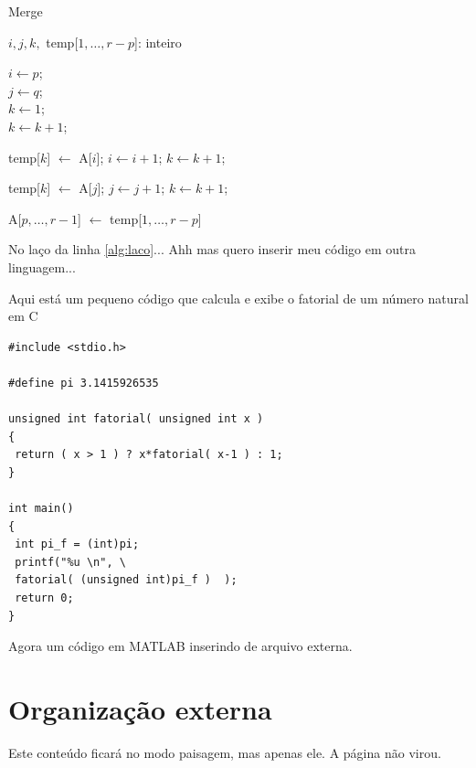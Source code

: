 \documentclass[10pt,a4paper,twocolumn]{book}
\begin{document}
		\begin{algorithm}[h]
			\caption{{\sc Merge }}
			\DontPrintSemicolon %
			$i, j, k,$ temp[$1, \ldots, r-p$]: inteiro 
			
			$i \gets p$;\\
			$j \gets q$;\\
			$k \gets 1$;\\
			
			{
				\label{alg:laco}
				$k \gets k + 1$;
			}
			
			{
				temp[$k$] $\gets$ A[$i$];\;
				$i \gets i + 1$;\;
				$k \gets k + 1$;
			}
			
			{
				temp[$k$] $\gets$ A[$j$];\; 
				$j \gets j + 1$;\;
				$k \gets k + 1$;
			}			
			
			A[$p , \ldots, r-1$] $\gets$ temp[$1, \ldots, r-p$]\;
			\;
			\label{algo:selectionsort}
		\end{algorithm}	
		
		No laço da linha \ref{alg:laco}...
		Ahh mas quero inserir meu código em outra linguagem...
		
\lstset{language=C}			
Aqui está um pequeno código que calcula e exibe o fatorial de um número natural em C

\begin{lstlisting}
#include <stdio.h>

#define pi 3.1415926535

unsigned int fatorial( unsigned int x )
{
 return ( x > 1 ) ? x*fatorial( x-1 ) : 1;
}

int main()
{
 int pi_f = (int)pi; 
 printf("%u \n", \
 fatorial( (unsigned int)pi_f )  );
 return 0;
}
\end{lstlisting}

Agora um código em MATLAB inserindo de arquivo externa.



\section{Organização externa}
	
	
	\begin{landscape}
		Este conteúdo ficará no modo paisagem, mas apenas ele. A página não virou.
	\end{landscape}

	
	
	
		\nocite{livro:joao}
		\nocite{conf:alckmin}
\end{document}
